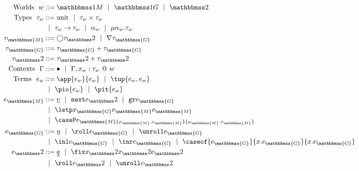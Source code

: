 
\newcommand{\exprM}{e_\mathbbmss{M}}
\newcommand{\exprG}{e_\mathbbmss{G}}
\newcommand{\exprT}{e_\bbtwo}
\newcommand{\varM}{x_\mathbbmss{M}}
\newcommand{\varG}{x_\mathbbmss{G}}
\newcommand{\varT}{x_\bbtwo}
\newcommand{\typeM}{\tau_\mathbbmss{M}}
\newcommand{\typeG}{\tau_\mathbbmss{G}}
\newcommand{\typeT}{\tau_\bbtwo}

\begin{figure}
\begin{abstrsyn}
\[\begin{aligned}
\text{Worlds}\ \ 
\world &::= \bbonem \gbar \bbonep \gbar \bbtwo  \\
%
\text{Types}\ \ 
\type_w &::= \text{unit}
 \gbar \type_w \times \type_w \\
&\gbar \type_w \to \type_w
 \gbar \alpha_w \gbar \mu \alpha_w.\tau_w \\
\typeM &::= \fut \typeT \gbar \curr \typeG \\
%
\typeG &::= \typeG + \typeG \\
%
\typeT &::= \typeT + \typeT \\
%
%
\text{Contexts}\ \ 
\context &::=\emptyC
 \gbar \context, x_w:\tau_w~@~w \\
%
\text{Terms}\ \ 
e_w &::= \app {e_w} {e_w} 
 \gbar \tup{e_w, e_w} \\
&\gbar \pio {e_w} 
 \gbar \pit {e_w} \\
\exprM &::= \exv v
 \gbar \next \exprT 
 \gbar \pure \exprG \\
&\gbar \letp \varG \exprM \exprM \\
&\gbar \caseP \exprM {\varM.\exprM} {\varM.\exprM} \\
\exprG &::= \exv u
 \gbar \roll \exprG \gbar \unroll \exprG \\
&\gbar \inl \exprG \gbar \inr \exprG
 \gbar \caseof {\exprG}{\var.\exprG}{\var.\exprG} \\ 
\exprT &::= \exv q
 \gbar \fix \varT \varT \exprT \\
&\gbar \roll \exprT \gbar \unroll \exprT \\

\end{aligned}\]
\end{abstrsyn}
\end{figure}

